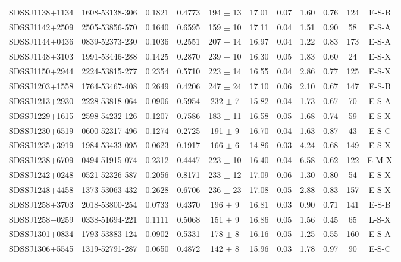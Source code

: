\documentclass{emulateapj}
\begin{document}
\begin{table*}[htbp]
\begin{center}
\begin{tabular}{c c c c c c c c c c c}
SDSSJ1138$+$1134 & 1608-53138-306 & 0.1821 & 0.4773 & 194 $\pm$   13 & 17.01 & 0.07 & 1.60 & 0.76 & 124 & E-S-B \\ 
SDSSJ1142$+$2509 & 2505-53856-570 & 0.1640 & 0.6595 & 159 $\pm$   10 & 17.11 & 0.04 & 1.51 & 0.90 & 58 & E-S-A \\ 
SDSSJ1144$+$0436 & 0839-52373-230 & 0.1036 & 0.2551 & 207 $\pm$   14 & 16.97 & 0.04 & 1.22 & 0.83 & 173 & E-S-A \\ 
SDSSJ1148$+$3103 & 1991-53446-288 & 0.1425 & 0.2870 & 239 $\pm$   10 & 16.30 & 0.05 & 1.83 & 0.60 & 24 & E-S-X \\ 
SDSSJ1150$+$2944 & 2224-53815-277 & 0.2354 & 0.5710 & 223 $\pm$   14 & 16.55 & 0.04 & 2.86 & 0.77 & 125 & E-S-X \\ 
SDSSJ1203$+$1558 & 1764-53467-408 & 0.2649 & 0.4206 & 247 $\pm$   24 & 17.10 & 0.06 & 2.10 & 0.67 & 147 & E-S-B \\ 
SDSSJ1213$+$2930 & 2228-53818-064 & 0.0906 & 0.5954 & 232 $\pm$    7 & 15.82 & 0.04 & 1.73 & 0.67 & 70 & E-S-A \\ 
SDSSJ1229$+$1615 & 2598-54232-126 & 0.1207 & 0.7586 & 183 $\pm$   11 & 16.58 & 0.05 & 1.68 & 0.74 & 59 & E-S-X \\ 
SDSSJ1230$+$6519 & 0600-52317-496 & 0.1274 & 0.2725 & 191 $\pm$    9 & 16.70 & 0.04 & 1.63 & 0.87 & 43 & E-S-C \\ 
SDSSJ1235$+$3919 & 1984-53433-095 & 0.0623 & 0.1917 & 166 $\pm$    6 & 14.86 & 0.03 & 4.24 & 0.68 & 149 & E-S-X \\ 
SDSSJ1238$+$6709 & 0494-51915-074 & 0.2312 & 0.4447 & 223 $\pm$   10 & 16.40 & 0.04 & 6.58 & 0.62 & 122 & E-M-X \\ 
SDSSJ1242$+$0248 & 0521-52326-587 & 0.2056 & 0.8171 & 233 $\pm$   12 & 17.09 & 0.06 & 1.30 & 0.80 & 54 & E-S-X \\ 
SDSSJ1248$+$4458 & 1373-53063-432 & 0.2628 & 0.6706 & 236 $\pm$   23 & 17.08 & 0.05 & 2.88 & 0.83 & 157 & E-S-X \\ 
SDSSJ1258$+$3703 & 2018-53800-254 & 0.0733 & 0.4370 & 196 $\pm$    9 & 16.81 & 0.03 & 0.90 & 0.71 & 141 & E-S-B \\ 
SDSSJ1258$-$0259 & 0338-51694-221 & 0.1111 & 0.5068 & 151 $\pm$    9 & 16.86 & 0.05 & 1.56 & 0.45 & 65 & L-S-X \\ 
SDSSJ1301$+$0834 & 1793-53883-124 & 0.0902 & 0.5331 & 178 $\pm$    8 & 16.16 & 0.05 & 1.25 & 0.55 & 160 & E-S-A \\ 
SDSSJ1306$+$5545 & 1319-52791-287 & 0.0650 & 0.4872 & 142 $\pm$    8 & 15.96 & 0.03 & 1.78 & 0.97 & 90 & E-S-C \\ 

\end{tabular}
\end{center}
\end{table*}
\end{document}
